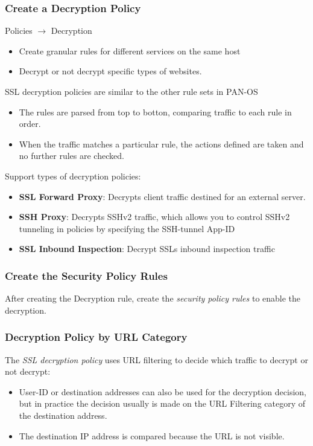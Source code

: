\subsubsection{Create a Decryption Policy}
Policies $\rightarrow$ Decryption
\begin{itemize}
    \item Create granular rules for different services on the same host
    \item Decrypt or not decrypt specific types of websites.
\end{itemize}
SSL decryption policies are similar to the other rule sets in PAN-OS
\begin{itemize}
    \item The rules are parsed from top to botton, comparing traffic to each rule in order.
    \item When the traffic matches a particular rule, the actions defined are taken and no further rules are checked.
\end{itemize}
Support types of decryption policies:
\begin{itemize}
    \item \textbf{SSL Forward Proxy}: Decrypts client traffic destined for an external server.
    \item \textbf{SSH Proxy}: Decrypts SSHv2 traffic, which allows you to control SSHv2 tunneling in policies by specifying the SSH-tunnel App-ID
    \item \textbf{SSL Inbound Inspection}: Decrypt SSLs inbound inspection traffic
\end{itemize}

\subsubsection{Create the Security Policy Rules}
After creating the Decryption rule, create the \textit{security policy rules} to enable the decryption.

\subsubsection{Decryption Policy by URL Category}
The \textit{SSL decryption policy} uses URL filtering to decide which traffic to decrypt or not decrypt:
\begin{itemize}
    \item User-ID or destination addresses can also be used for the decryption decision, but in practice the decision usually is made on the URL Filtering category of the destination address.
    \item The destination IP address is compared because the URL is not visible.
\end{itemize}

